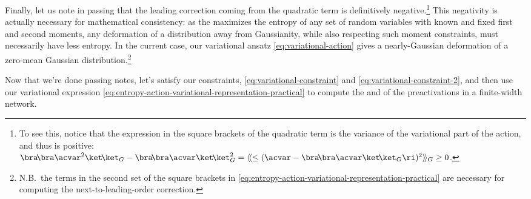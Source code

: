 Finally, let us note in passing that the leading correction coming from the quadratic term is definitively negative.\footnote{To see this, notice that the expression in the square brackets of the quadratic term is the variance of the variational part of the action, and thus is positive: $\bra\!\bra \acvar^2\ket\!\ket_{G}-\bra\!\bra \acvar\ket\!\ket_{G}^2=\langle\!\langle\le(\acvar-\bra\!\bra \acvar\ket\!\ket_{G}\ri)^2\rangle\!\rangle_{G}\geq 0$.
}
This negativity is actually necessary for mathematical consistency: as the  maximizes the entropy of any set of random variables with known and fixed first and second moments, any deformation of a distribution away from Gaussianity, while also respecting such moment constraints, must necessarily have less entropy.
In the current case, our variational ansatz \eqref{eq:variational-action} gives a nearly-Gaussian deformation of a zero-mean Gaussian distribution.\footnote{
    N.B.~the terms in the second set of the square brackets in \eqref{eq:entropy-action-variational-representation-practical} are necessary for computing the next-to-leading-order correction.
}











Now that we're done passing notes,
let's satisfy our constraints, \eqref{eq:variational-constraint} and \eqref{eq:variational-constraint-2}, and then use our variational expression \eqref{eq:entropy-action-variational-representation-practical} to compute the  and  of the preactivations in a finite-width network.

